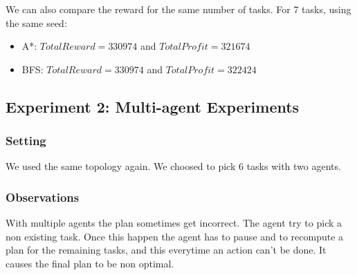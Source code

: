 \documentclass[11pt]{article}
\begin{document}
We can also compare the reward for the same number of tasks. For 7 tasks, using the same seed:
\begin{itemize}
\item A*: $TotalReward = 330974$ and $TotalProfit = 321674$
\item BFS: $TotalReward = 330974$ and $TotalProfit = 322424$
\end{itemize}

\subsection{Experiment 2: Multi-agent Experiments}

\subsubsection{Setting}
We used the same topology again. We choosed to pick 6 tasks with two agents.

\subsubsection{Observations}
With multiple agents the plan sometimes get incorrect. The agent try to pick a non existing task. Once this happen the agent has to pause and to recompute a plan for the remaining tasks, and this everytime an action can't be done. It causes the final plan to be non optimal. 
\end{document}
